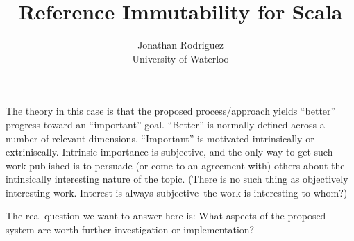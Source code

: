 \documentclass[letterpaper,11pt]{article}
\theoremstyle{definition}
\theoremstyle{remark}
\begin{document}
\title{Reference Immutability for Scala}
\author{Jonathan Rodriguez\\University of Waterloo}
\maketitle


The theory in this case is that the proposed process/approach yields ``better'' progress toward an ``important'' goal.
``Better'' is normally defined across a number of relevant dimensions.
``Important'' is motivated intrinsically or extriniscally.
Intrinsic importance is subjective, and the only way to get such work published is to persuade (or come to an agreement with) others about the intinsically interesting nature of the topic. (There is no such thing as objectively interesting work. Interest is always subjective--the work is interesting to whom?)


The real question we want to answer here is:
What aspects of the proposed system are worth further investigation or implementation?
\end{document}
